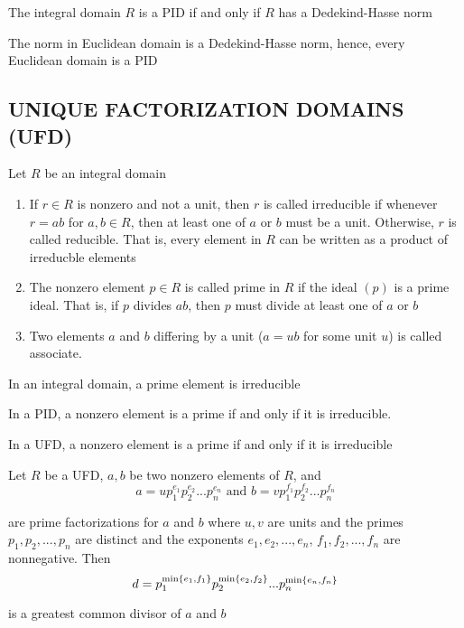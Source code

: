 \begin{proposition}
	The integral domain $R$ is a PID if and only if $R$ has a Dedekind-Hasse norm
\end{proposition}

\begin{corollary}
	The norm in Euclidean domain is a Dedekind-Hasse norm, hence, every Euclidean domain is a PID
\end{corollary}

\subsection{UNIQUE FACTORIZATION DOMAINS (UFD)}

\begin{definition}
	Let $R$ be an integral domain
	\begin{enumerate}
		\item If $r \in R$ is nonzero and not a unit, then $r$ is called irreducible if whenever $r = ab$ for $a, b \in R$, then at least one of $a$ or $b$ must be a unit. Otherwise, $r$ is called reducible. That is, every element in $R$ can be written as a product of irreducble elements
		
		\item The nonzero element $p \in R$ is called prime in $R$ if the ideal $(p)$ is a prime ideal. That is, if $p$ divides $ab$, then $p$ must divide at least one of $a$ or $b$
		
		\item Two elements $a$ and $b$ differing by a unit ($a = ub$ for some unit $u$) is called associate.
	\end{enumerate}
\end{definition}

\begin{proposition}
	In an integral domain, a prime element is irreducible
\end{proposition}

\begin{proposition}
	In a PID, a nonzero element is a prime if and only if it is irreducible.
\end{proposition}

\begin{proposition}
	In a UFD, a nonzero element is a prime if and only if it is irreducible
\end{proposition}

\begin{proposition}
	Let $R$ be a UFD, $a, b$ be two nonzero elements of $R$, and
	$$
		a = u p_1^{e_1} p_2^{e_2} ... p_n^{e_n} \text{ and } b = v p_1^{f_1} p_2^{f_2} ... p_n^{f_n}
	$$
	
	are prime factorizations for $a$ and $b$ where $u, v$ are units and the primes $p_1, p_2, ..., p_n$ are distinct and the exponents $e_1, e_2, ..., e_n$, $f_1, f_2, ..., f_n$ are nonnegative. Then
	$$
		d = p_1^{\min\{e_1, f_1\}} p_2^{\min\{e_2, f_2\}} ... p_n^{\min\{e_n, f_n\}}
	$$
	
	is a greatest common divisor of $a$ and $b$
\end{proposition}

